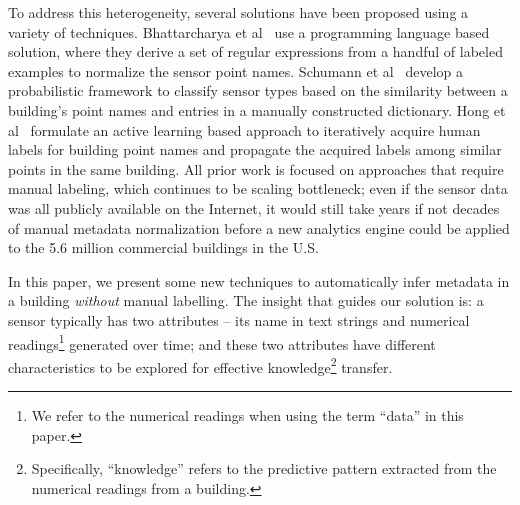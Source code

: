To address this heterogeneity, several solutions have been proposed using a variety of techniques.
Bhattarcharya et al~\cite{arka} use a programming language based solution,
where they derive a set of regular expressions from a handful of labeled examples
to normalize the sensor point names.
Schumann et al~\cite{ibm} develop a probabilistic framework to classify sensor types
based on the similarity between a building's point names and entries in a manually constructed dictionary.
Hong et al~\cite{cikm} formulate an active learning based approach to iteratively
acquire human labels for building point names and propagate the acquired labels among similar points in the same building. All prior work is focused on approaches that require manual labeling, which
continues to be scaling bottleneck;
even if the sensor data was all publicly available on the Internet, it would still take years if not decades of manual metadata normalization before a new analytics engine could be applied to the 5.6 million commercial buildings in the U.S.


In this paper, we present some new techniques to automatically infer metadata in a building {\it without} manual labelling.
The insight that guides our solution is: a sensor typically has two attributes -- its name in text strings and numerical readings\footnote{We refer to the numerical readings when using the term ``data'' in this paper.} generated over time; and these two attributes have different characteristics to be explored for effective knowledge\footnote{Specifically, ``knowledge'' refers to the predictive pattern extracted from the numerical readings from a building.} transfer.

